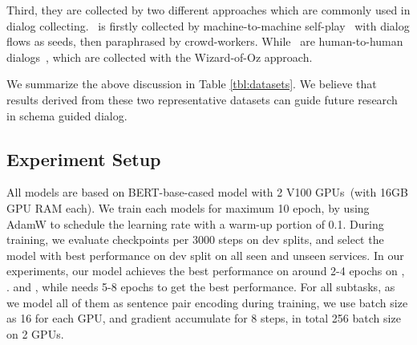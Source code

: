 Third, they are collected by two different approaches which are
commonly used in dialog collecting. \sgdst~is firstly collected by
machine-to-machine self-play~\cite[M2M,][]{shah2018building} with
dialog flows as seeds, then paraphrased by crowd-workers. While
\multiwoz~are human-to-human
dialogs~\cite[H2H,][]{kelley1984iterative}, which are collected with
the Wizard-of-Oz approach.

We summarize the above discussion in Table \ref{tbl:datasets}.  We
believe that results derived from these two representative datasets can
guide future research in schema guided dialog.


\subsection{Experiment Setup}
\label{ssec:sgd:exp-setup}
All models are based on BERT-base-cased model with 2 V100 GPUs~(with
16GB GPU RAM each). We train each models for maximum 10 epoch, by
using AdamW to schedule the learning rate with a warm-up portion of
0.1. During training, we evaluate checkpoints per 3000 steps on dev
splits, and select the model with best performance on dev split on all
seen and unseen services. In our experiments, our model achieves the
best performance on around 2-4 epochs on \IC, \RSI. and \CSL, while
\NSL needs 5-8 epochs to get the best performance. For all subtasks, as
we model all of them as sentence pair encoding during training, we use
batch size as 16 for each GPU, and gradient accumulate for 8 steps, in
total 256 batch size on 2 GPUs.


